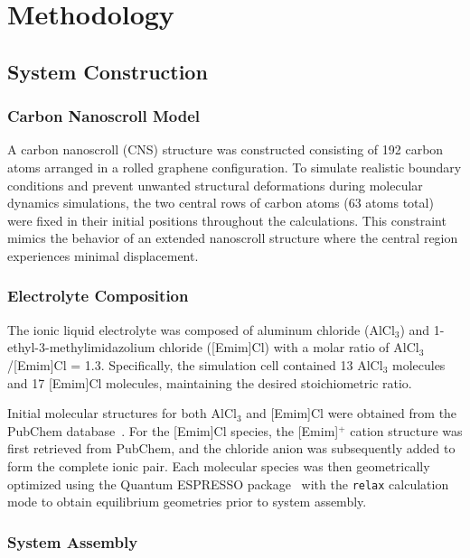 \section{Methodology}

\subsection{System Construction}

\subsubsection{Carbon Nanoscroll Model}

A carbon nanoscroll (CNS) structure was constructed consisting of 192 carbon atoms arranged in a rolled graphene configuration. To simulate realistic boundary conditions and prevent unwanted structural deformations during molecular dynamics simulations, the two central rows of carbon atoms (63 atoms total) were fixed in their initial positions throughout the calculations. This constraint mimics the behavior of an extended nanoscroll structure where the central region experiences minimal displacement.

\subsubsection{Electrolyte Composition}

The ionic liquid electrolyte was composed of aluminum chloride (AlCl$_3$) and 1-ethyl-3-methylimidazolium chloride ([Emim]Cl) with a molar ratio of AlCl$_3$/[Emim]Cl = 1.3. Specifically, the simulation cell contained 13 AlCl$_3$ molecules and 17 [Emim]Cl molecules, maintaining the desired stoichiometric ratio.

Initial molecular structures for both AlCl$_3$ and [Emim]Cl were obtained from the PubChem database~\cite{pubchem}. For the [Emim]Cl species, the [Emim]$^+$ cation structure was first retrieved from PubChem, and the chloride anion was subsequently added to form the complete ionic pair. Each molecular species was then geometrically optimized using the Quantum ESPRESSO package~\cite{qe} with the \texttt{relax} calculation mode to obtain equilibrium geometries prior to system assembly.

\subsubsection{System Assembly}

